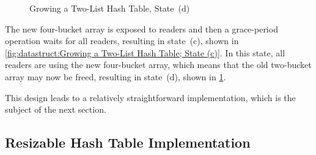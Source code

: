 \begin{figure}
\centering
{}
\caption{Growing a Two-List Hash Table, State~(d)}
\label{fig:datastruct:Growing a Two-List Hash Table; State (d)}
\end{figure}

The new four-bucket array is exposed to readers and then a grace-period
operation waits for all readers, resulting in state~(c), shown in
\cref{fig:datastruct:Growing a Two-List Hash Table; State (c)}.
In this state, all readers are using the new four-bucket array,
which means that the old two-bucket array may now be freed, resulting
in state~(d), shown in
\cref{fig:datastruct:Growing a Two-List Hash Table; State (d)}.

This design leads to a relatively straightforward implementation,
which is the subject of the next section.

\subsection{Resizable Hash Table Implementation}
\label{sec:datastruct:Resizable Hash Table Implementation}

